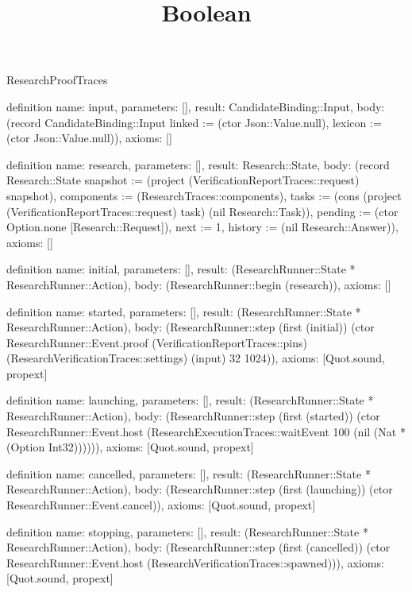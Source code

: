\begin{lexlean}{ResearchProofTraces}
\title{Boolean}
\begin{semanticmodule}

definition{
 name: input,
 parameters: [],
 result: CandidateBinding::Input,
 body: (record CandidateBinding::Input {linked := (ctor Json::Value.null), lexicon := (ctor Json::Value.null)}),
 axioms: []
}

definition{
 name: research,
 parameters: [],
 result: Research::State,
 body: (record Research::State {snapshot := (project (VerificationReportTraces::request) snapshot), components := (ResearchTraces::components), tasks := (cons (project (VerificationReportTraces::request) task) (nil Research::Task)), pending := (ctor Option.none [Research::Request]), next := 1, history := (nil Research::Answer)}),
 axioms: []
}

definition{
 name: initial,
 parameters: [],
 result: (ResearchRunner::State * ResearchRunner::Action),
 body: (ResearchRunner::begin (research)),
 axioms: []
}

definition{
 name: started,
 parameters: [],
 result: (ResearchRunner::State * ResearchRunner::Action),
 body: (ResearchRunner::step (first (initial)) (ctor ResearchRunner::Event.proof (VerificationReportTraces::pins) (ResearchVerificationTraces::settings) (input) 32 1024)),
 axioms: [Quot.sound, propext]
}

definition{
 name: launching,
 parameters: [],
 result: (ResearchRunner::State * ResearchRunner::Action),
 body: (ResearchRunner::step (first (started)) (ctor ResearchRunner::Event.host (ResearchExecutionTraces::waitEvent 100 (nil (Nat * (Option Int32)))))),
 axioms: [Quot.sound, propext]
}

definition{
 name: cancelled,
 parameters: [],
 result: (ResearchRunner::State * ResearchRunner::Action),
 body: (ResearchRunner::step (first (launching)) (ctor ResearchRunner::Event.cancel)),
 axioms: [Quot.sound, propext]
}

definition{
 name: stopping,
 parameters: [],
 result: (ResearchRunner::State * ResearchRunner::Action),
 body: (ResearchRunner::step (first (cancelled)) (ctor ResearchRunner::Event.host (ResearchVerificationTraces::spawned))),
 axioms: [Quot.sound, propext]
}


\end{semanticmodule}
\end{lexlean}
